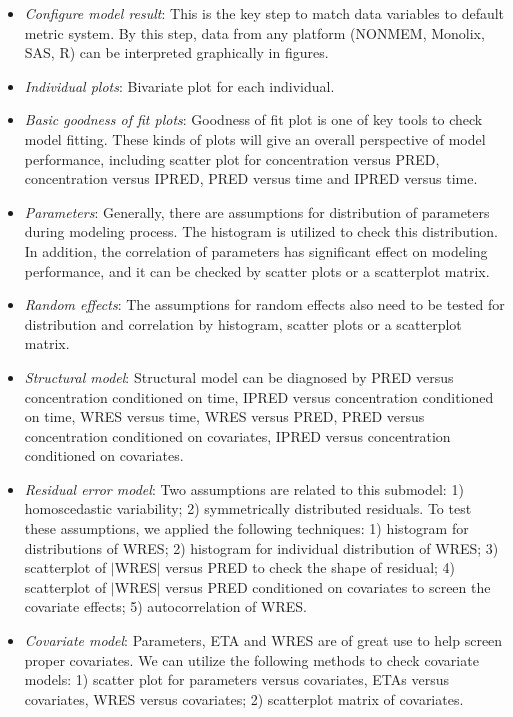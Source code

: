 \documentclass[a4paper]{article}
\begin{document}
\begin{itemize}
	\item \textit{Configure model result}: This is the key step to match data variables to default metric system. By this step, data from any platform (NONMEM, Monolix, SAS, R) can be interpreted graphically in figures.
	\item \textit{Individual plots}: Bivariate plot for each individual.
	\item \textit{Basic goodness of fit plots}: Goodness of fit plot is one of key tools to check model fitting. These kinds of plots will give an overall perspective of model performance, including scatter plot for concentration versus PRED, concentration versus IPRED, PRED versus time and IPRED versus time.
\item \textit{Parameters}: Generally, there are assumptions for distribution of parameters during modeling process. The histogram is utilized to check this distribution. In addition, the correlation of parameters has significant effect on modeling performance, and it can be checked by scatter plots or a scatterplot matrix.
\item \textit{Random effects}: The assumptions for random effects also need to be tested for distribution and correlation by histogram, scatter plots or a scatterplot matrix.
\item \textit{Structural model}: Structural model can be diagnosed by PRED versus concentration conditioned on time, IPRED versus concentration conditioned on time, WRES versus time, WRES versus PRED, PRED versus concentration conditioned on covariates, IPRED versus concentration conditioned on covariates.
\item \textit{Residual error model}: Two assumptions are related to this submodel: 1) homoscedastic variability; 2) symmetrically distributed residuals. To test these assumptions, we applied the following techniques: 1) histogram for distributions of WRES; 2) histogram for individual distribution of WRES; 3) scatterplot of $|$WRES$|$ versus PRED to check the shape of residual; 4) scatterplot of $|$WRES$|$ versus PRED conditioned on covariates to screen the covariate effects; 5) autocorrelation of WRES.
\item \textit{Covariate model}: Parameters, ETA and WRES are of great use to help screen proper covariates. We can utilize the following methods to check covariate models: 1) scatter plot for parameters versus covariates, ETAs versus covariates, WRES versus covariates; 2) scatterplot matrix of covariates.
\end{itemize}
\end{document}
